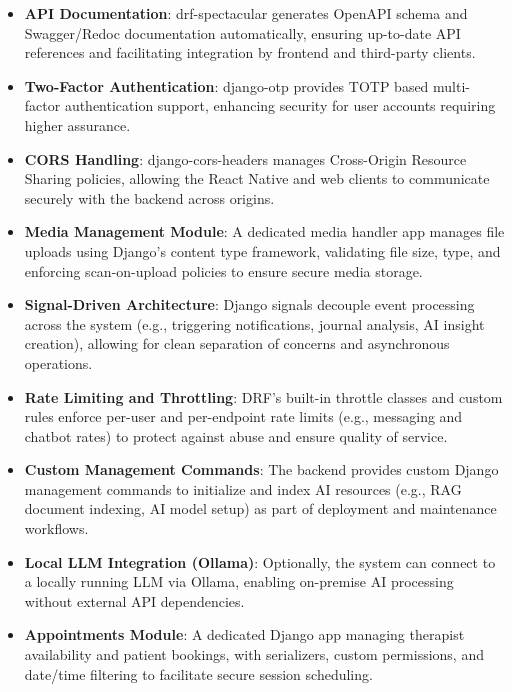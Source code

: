 \begin{itemize}
  \item \textbf{API Documentation}: drf-spectacular generates OpenAPI schema and Swagger/Redoc documentation automatically, ensuring up-to-date API references and facilitating integration by frontend and third-party clients.
  
  \item \textbf{Two-Factor Authentication}: django-otp provides TOTP based multi-factor authentication support, enhancing security for user accounts requiring higher assurance.
  
  \item \textbf{CORS Handling}: django-cors-headers manages Cross-Origin Resource Sharing policies, allowing the React Native and web clients to communicate securely with the backend across origins.

  \item \textbf{Media Management Module}: A dedicated media handler app manages file uploads using Django's content type framework, validating file size, type, and enforcing scan-on-upload policies to ensure secure media storage.

  \item \textbf{Signal-Driven Architecture}: Django signals decouple event processing across the system (e.g., triggering notifications, journal analysis, AI insight creation), allowing for clean separation of concerns and asynchronous operations.

  \item \textbf{Rate Limiting and Throttling}: DRF's built-in throttle classes and custom rules enforce per-user and per-endpoint rate limits (e.g., messaging and chatbot rates) to protect against abuse and ensure quality of service.

  \item \textbf{Custom Management Commands}: The backend provides custom Django management commands to initialize and index AI resources (e.g., RAG document indexing, AI model setup) as part of deployment and maintenance workflows.

  \item \textbf{Local LLM Integration (Ollama)}: Optionally, the system can connect to a locally running LLM via Ollama, enabling on-premise AI processing without external API dependencies.

  \item \textbf{Appointments Module}: A dedicated Django app managing therapist availability and patient bookings, with serializers, custom permissions, and date/time filtering to facilitate secure session scheduling.


\end{itemize}
